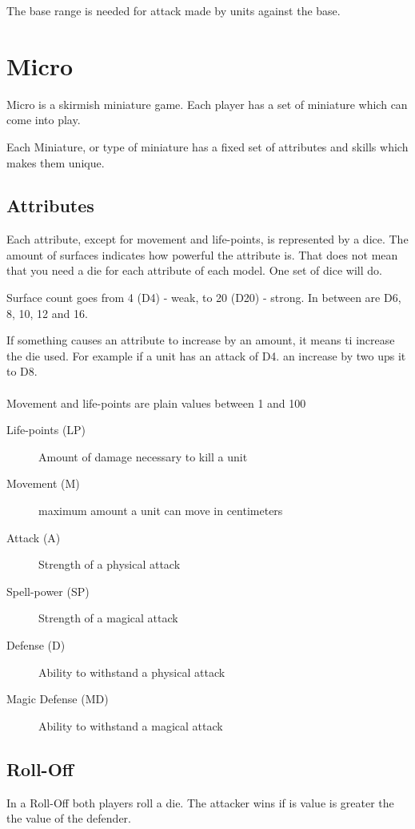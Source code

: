 \documentclass[a5paper,pagesize,10pt,bibtotoc,pointlessnumbers,
normalheadings,DIV=9,twoside=false]{scrbook}
\begin{document}
The base range is needed for attack made by units against the base.


\chapter{Micro}

Micro is a skirmish miniature game. Each player has a set of miniature which can come into play.

Each Miniature, or type of miniature has a fixed set of attributes and skills which makes them unique.

\section{Attributes}
Each attribute, except for movement and life-points, is represented by a dice. The amount of surfaces indicates how powerful the attribute is.
That does not mean that you need a die for each attribute of each model. One set of dice will do.

Surface count goes from 4 (D4) - weak, to 20 (D20) - strong. In between are D6, 8, 10, 12 and 16.

If something causes an attribute to increase by an amount, it means ti increase the die used. For example if a unit has an attack of D4. an increase by two ups it to D8.\\
\\
Movement and life-points are plain values between 1 and 100

\begin{description}
\item[Life-points (LP)]
Amount of damage necessary to kill a unit
\item[Movement (M)]
maximum amount a unit can move in centimeters
\item[Attack (A)]
Strength of a physical attack
\item[Spell-power (SP)]
Strength of a magical attack
\item[Defense (D)]
Ability to withstand a physical attack
\item[Magic Defense (MD)]
Ability to withstand a magical attack
\end{description}

\section{Roll-Off}
In a Roll-Off both players roll a die. The attacker wins if is value is greater the the value of the defender.
\end{document}
